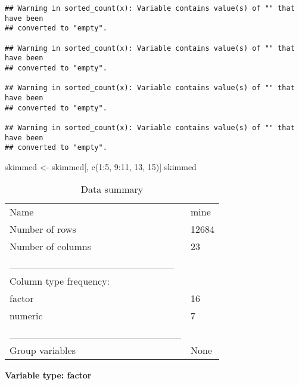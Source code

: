 \documentclass[
]{article}
\newenvironment{Shaded}{\begin{snugshade}}{\end{snugshade}}
\newcommand{\DecValTok}[1]{\textcolor[rgb]{0.00,0.00,0.81}{#1}}
\newcommand{\FunctionTok}[1]{\textcolor[rgb]{0.00,0.00,0.00}{#1}}
\newcommand{\NormalTok}[1]{#1}
\newcommand{\OtherTok}[1]{\textcolor[rgb]{0.56,0.35,0.01}{#1}}
\newcommand{\SpecialCharTok}[1]{\textcolor[rgb]{0.00,0.00,0.00}{#1}}
\begin{document}
\begin{verbatim}
## Warning in sorted_count(x): Variable contains value(s) of "" that have been
## converted to "empty".

## Warning in sorted_count(x): Variable contains value(s) of "" that have been
## converted to "empty".

## Warning in sorted_count(x): Variable contains value(s) of "" that have been
## converted to "empty".

## Warning in sorted_count(x): Variable contains value(s) of "" that have been
## converted to "empty".
\end{verbatim}

\begin{Shaded}
\begin{Highlighting}[]
\NormalTok{skimmed }\OtherTok{\textless{}{-}}\NormalTok{ skimmed[, }\FunctionTok{c}\NormalTok{(}\DecValTok{1}\SpecialCharTok{:}\DecValTok{5}\NormalTok{, }\DecValTok{9}\SpecialCharTok{:}\DecValTok{11}\NormalTok{, }\DecValTok{13}\NormalTok{, }\DecValTok{15}\NormalTok{)]}
\NormalTok{skimmed}
\end{Highlighting}
\end{Shaded}

\begin{longtable}[]{@{}ll@{}}
\caption{Data summary}\tabularnewline
\toprule
\endhead
Name & mine \\
Number of rows & 12684 \\
Number of columns & 23 \\
\_\_\_\_\_\_\_\_\_\_\_\_\_\_\_\_\_\_\_\_\_\_\_ & \\
Column type frequency: & \\
factor & 16 \\
numeric & 7 \\
\_\_\_\_\_\_\_\_\_\_\_\_\_\_\_\_\_\_\_\_\_\_\_\_ & \\
Group variables & None \\
\bottomrule
\end{longtable}

\textbf{Variable type: factor}
\end{document}
